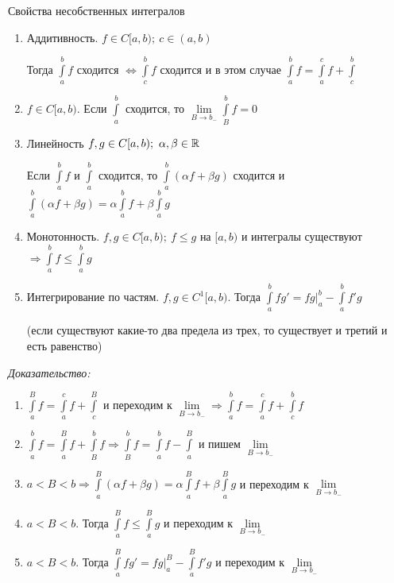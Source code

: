 \documentclass[12pt]{article}
\begin{document}
\begin{theo}{Свойства несобственных интегралов}
    \begin{enumerate}
        \item Аддитивность. $f \in C[a, b);\ c \in (a, b)$
        
        Тогда $\int\limits_a^b f$ сходится $\Leftrightarrow \int\limits_c^b f$ сходится и в этом случае $\int\limits_a^b f = \int\limits_a^c f + \int\limits_c^b$

        \item $f \in C[a, b)$. Если $\int\limits_a^b$ сходится, то $\lim\limits_{B \to b_-} \int\limits_B^b f = 0$
        
        \item Линейность $f, g \in C[a, b);\ \alpha, \beta \in \mathbb R$
        
        Если $\int\limits_a^b f$ и $\int\limits_a^b$ сходится, то $\int\limits_a^b(\alpha f + \beta g)$ сходится и $\int\limits_a^b (\alpha f + \beta g) = \alpha \int\limits_a^b f + \beta \int\limits_a^b g$

        \item Монотонность. $f, g \in C[a, b);\ f \leq g$ на $[a, b)$ и интегралы существуют $\Rightarrow \int\limits_a^b f \leq \int\limits_a^b g$
        
        \item Интегрирование по частям. $f, g \in C^1[a, b)$. Тогда $\int\limits_a^b fg' = fg|_a^b - \int\limits_a^b f'g$
        
        (если существуют какие-то два предела из трех, то существует и третий и есть равенство)
    \end{enumerate}
\end{theo}

\textit{Доказательство:}

\begin{enumerate}
    \item $\int\limits_a^B f = \int\limits_a^c f + \int\limits_c^B$ и переходим к $\lim\limits_{B \to b_-} \Rightarrow \int\limits_a^b f = \int\limits_a^c f + \int\limits_c^b f$
    
    \item $\int\limits_a^b f = \int\limits_a^B f + \int\limits_B^b f \Rightarrow \int\limits_B^b f = \int\limits_a^b f - \int\limits_a^B$ и пишем $\lim\limits_{B \to b_-}$
    
    \item $a < B < b \Rightarrow \int\limits_a^B (\alpha f + \beta g) = \alpha \int\limits_a^B f + \beta \int\limits_a^B g$ и переходим к $\lim\limits_{B \to b_-}$
    
    \item $a < B < b$. Тогда $\int\limits_a^B f \leq \int\limits_a^B g$ и переходим к $\lim\limits_{B \to b_-}$
    
    \item $a < B < b$. Тогда $\int\limits_a^B fg' = fg|_a^B - \int\limits_a^B f'g$ и переходим к $\lim\limits_{B \to b_-}$
\end{enumerate}
\end{document}
